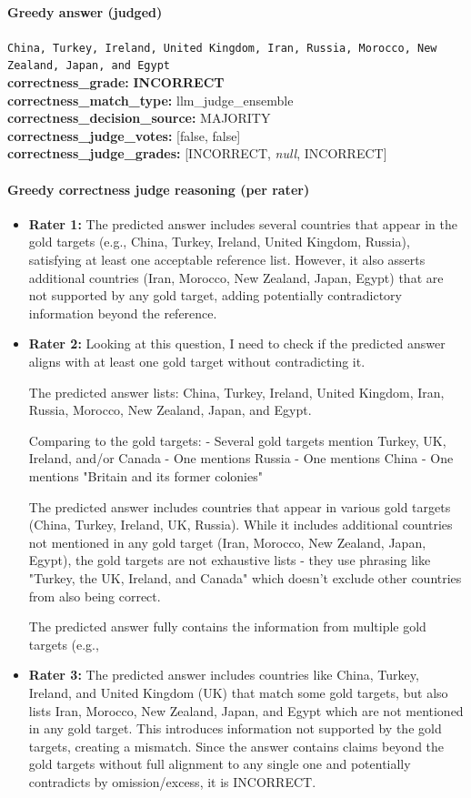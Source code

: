\documentclass[11pt]{article}
\newcommand{\gradebad}[1]{\textcolor{red!70!black}{\textbf{#1}}}
\newcommand{\mono}[1]{\texttt{#1}}
\begin{document}
\paragraph{Greedy answer (judged)}
\mono{China, Turkey, Ireland, United Kingdom, Iran, Russia, Morocco, New Zealand, Japan, and Egypt}\\
\textbf{correctness\_grade:} \gradebad{INCORRECT}\\
\textbf{correctness\_match\_type:} llm\_judge\_ensemble\\
\textbf{correctness\_decision\_source:} MAJORITY\\
\textbf{correctness\_judge\_votes:} [false, false]\\
\textbf{correctness\_judge\_grades:} [INCORRECT, \emph{null}, INCORRECT]\\
\paragraph{Greedy correctness judge reasoning (per rater)}
\begin{itemize}
\item \textbf{Rater 1:} The predicted answer includes several countries that appear in the gold targets (e.g., China, Turkey, Ireland, United Kingdom, Russia), satisfying at least one acceptable reference list. However, it also asserts additional countries (Iran, Morocco, New Zealand, Japan, Egypt) that are not supported by any gold target, adding potentially contradictory information beyond the reference.
\item \textbf{Rater 2:} Looking at this question, I need to check if the predicted answer aligns with at least one gold target without contradicting it.

The predicted answer lists: China, Turkey, Ireland, United Kingdom, Iran, Russia, Morocco, New Zealand, Japan, and Egypt.

Comparing to the gold targets:
- Several gold targets mention Turkey, UK, Ireland, and/or Canada
- One mentions Russia
- One mentions China
- One mentions "Britain and its former colonies"

The predicted answer includes countries that appear in various gold targets (China, Turkey, Ireland, UK, Russia). While it includes additional countries not mentioned in any gold target (Iran, Morocco, New Zealand, Japan, Egypt), the gold targets are not exhaustive lists - they use phrasing like "Turkey, the UK, Ireland, and Canada" which doesn't exclude other countries from also being correct.

The predicted answer fully contains the information from multiple gold targets (e.g.,
\item \textbf{Rater 3:} The predicted answer includes countries like China, Turkey, Ireland, and United Kingdom (UK) that match some gold targets, but also lists Iran, Morocco, New Zealand, Japan, and Egypt which are not mentioned in any gold target. This introduces information not supported by the gold targets, creating a mismatch. Since the answer contains claims beyond the gold targets without full alignment to any single one and potentially contradicts by omission/excess, it is INCORRECT.
\end{itemize}
\end{document}
